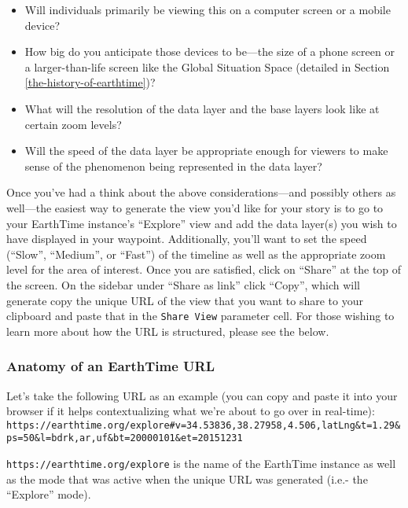 \documentclass[
]{krantz}
\providecommand{\tightlist}{%
  \setlength{\itemsep}{0pt}\setlength{\parskip}{0pt}}
\begin{document}
\begin{itemize}
\tightlist
\item
  Will individuals primarily be viewing this on a computer screen or a mobile device?
\item
  How big do you anticipate those devices to be---the size of a phone screen or a larger-than-life screen like the Global Situation Space (detailed in Section \ref{the-history-of-earthtime})?
\item
  What will the resolution of the data layer and the base layers look like at certain zoom levels?
\item
  Will the speed of the data layer be appropriate enough for viewers to make sense of the phenomenon being represented in the data layer?
\end{itemize}

Once you've had a think about the above considerations---and possibly others as well---the easiest way to generate the view you'd like for your story is to go to your EarthTime instance's ``Explore'' view and add the data layer(s) you wish to have displayed in your waypoint. Additionally, you'll want to set the speed (``Slow'', ``Medium'', or ``Fast'') of the timeline as well as the appropriate zoom level for the area of interest. Once you are satisfied, click on ``Share'' at the top of the screen. On the sidebar under ``Share as link'' click ``Copy'', which will generate copy the unique URL of the view that you want to share to your clipboard and paste that in the \texttt{Share\ View} parameter cell. For those wishing to learn more about how the URL is structured, please see the below.

\hypertarget{anatomy-of-an-earthtime-url}{%
\subsubsection*{Anatomy of an EarthTime URL}\label{anatomy-of-an-earthtime-url}}


Let's take the following URL as an example (you can copy and paste it into your browser if it helps contextualizing what we're about to go over in real-time): \texttt{https://earthtime.org/explore\#v=34.53836,38.27958,4.506,latLng\&t=1.29\&ps=50\&l=bdrk,ar,uf\&bt=20000101\&et=20151231}

\texttt{https://earthtime.org/explore} is the name of the EarthTime instance as well as the mode that was active when the unique URL was generated (i.e.- the ``Explore'' mode).
\end{document}
